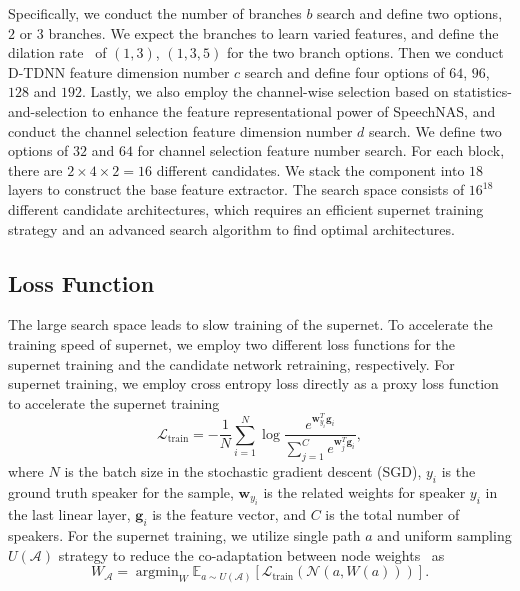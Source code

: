 \documentclass{article}
\DeclareMathOperator*{\argmin}{argmin}
\begin{document}
Specifically, we conduct the number of branches $b$ search and define two options, $2$ or $3$ branches. We expect the branches to learn varied features, and define the dilation rate~\cite{yu2017dilated} of $(1, 3)$, $(1, 3, 5)$ for the two branch options. Then we conduct D-TDNN feature dimension number $c$ search and define four options of $64$, $96$, $128$ and $192$. Lastly, we also employ the channel-wise selection based on statistics-and-selection to enhance the feature representational power of SpeechNAS, and conduct the channel selection feature dimension number $d$ search. We define two options of $32$ and $64$ for channel selection feature number search. For each block, there are $2 \times 4 \times 2 = 16$ different candidates. We stack the component into $18$ layers to construct the base feature extractor. The search space consists of $16^{18}$ different candidate architectures, which requires an efficient supernet training strategy and an advanced search algorithm to find optimal architectures.  

\subsection{Loss Function}\label{sec:loss_function}
The large search space leads to slow training of the supernet. To accelerate the training speed of supernet, we employ two different loss functions for the supernet training and the candidate network retraining, respectively. For supernet training, we employ cross entropy loss directly as a proxy loss function to accelerate the supernet training
\begin{equation}
    \mathcal{L}_{\text{train}} = -\frac{1}{N} \sum_{i=1}^{N} \log \frac{e^{\bm{w}_{y_i}^{T}\bm{g}_i}}{\sum_{j=1}^{C}e^{\bm{w}_{j}^{T}\bm{g}_i}},\label{eq:supernet_train}
\end{equation}
where $N$ is the batch size in the stochastic gradient descent (SGD), $y_i$ is the ground truth speaker for the sample, $\bm{w}_{y_i}$ is the related weights for speaker $y_i$ in the last linear layer, $\bm{g}_i$ is the feature vector, and $C$ is the total number of speakers. For the supernet training, we utilize single path $a$ and uniform sampling $U(\mathcal{A})$ strategy to reduce the co-adaptation between node weights~\cite{guo2020single} as
\begin{equation}
    W_{\mathcal{A}} = {\argmin}_{W} \mathbb{E}_{a \sim U(\mathcal{A})} [ \mathcal{L}_{\text{train}}(\mathcal{N}(a, W(a)))].\label{eq:spuniform}
\end{equation}
\end{document}
